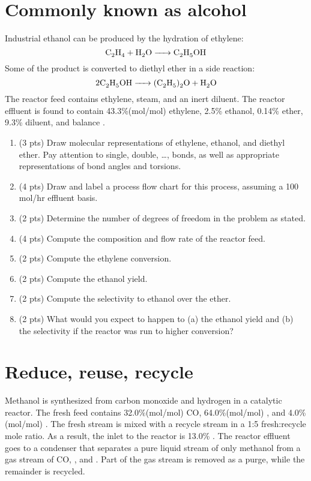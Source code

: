 \documentclass[11pt]{article}
\begin{document}
\section{Commonly known as alcohol}
\label{sec-3}
Industrial ethanol can be produced by the hydration of ethylene:
\begin{equation}
\label{eq:1}
\ce{C2H4 + H2O -> C2H5OH}
\end{equation}
Some of the product is converted to diethyl ether in a side reaction:
\begin{equation}
\label{eq:2}
\ce{2 C2H5OH -> (C2H5)2O + H2O}
\end{equation}
The reactor feed contains ethylene, steam, and an inert diluent.  The reactor effluent is found to contain 43.3\%(mol/mol) ethylene, 2.5\% ethanol, 0.14\% ether,  9.3\% diluent, and balance .

\begin{enumerate}
\item (3 pts) Draw molecular representations of ethylene, ethanol, and diethyl ether. Pay attention to single, double, \ldots{}, bonds, as well as appropriate representations of bond angles and torsions.
\item (4 pts) Draw and label a process flow chart for this process, assuming a 100 mol/hr effluent basis.
\item (2 pts) Determine the number of degrees of freedom in the problem as stated.
\item (4 pts) Compute the composition and flow rate of the reactor feed.
\item (2 pts) Compute the ethylene conversion.
\item (2 pts) Compute the ethanol yield.
\item (2 pts) Compute the selectivity to ethanol over the ether.
\item (2 pts) What would you expect to happen to (a) the ethanol yield and (b) the selectivity if the reactor was run to higher conversion?
\end{enumerate}

\section{Reduce, reuse, recycle}
\label{sec-4}
Methanol is synthesized from carbon monoxide and hydrogen in a catalytic reactor.  The fresh feed contains 32.0\%(mol/mol) CO, 64.0\%(mol/mol) , and 4.0\%(mol/mol) .  The fresh stream is mixed with a recycle stream in a 1:5 fresh:recycle mole ratio.  As a result, the inlet to the reactor is 13.0\% .  The reactor effluent goes to a condenser that separates a pure liquid stream of only methanol from a gas stream of CO, , and .  Part of the gas stream is removed as a purge, while the remainder is recycled.
\end{document}
